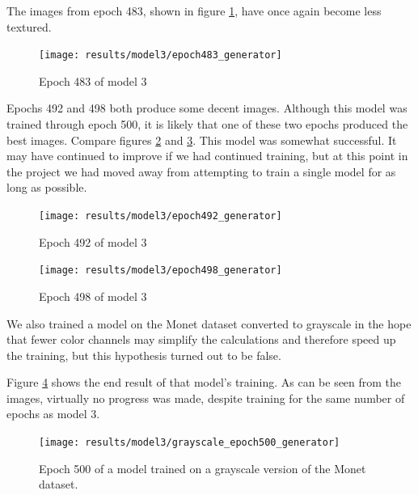\documentclass[11pt,letterpaper]{article}
\begin{document}
				The images from epoch 483, shown in figure \ref{fig:cgm:epoch483generator}, have once again become less textured.
				\begin{figure}
					\centering
					\texttt{[image: results/model3/epoch483\_generator]}
					\caption[]{Epoch 483 of model 3}
					\label{fig:cgm:epoch483generator}
				\end{figure}

				Epochs 492 and 498 both produce some decent images.
				Although this model was trained through epoch 500, it is likely that one of these two epochs produced the best images.
				Compare figures \ref{fig:cgm:epoch492generator} and \ref{fig:cgm:epoch498generator}.
				This model was somewhat successful.
				It may have continued to improve if we had continued training, but at this point in the project we had moved away from attempting to train a single model for as long as possible.
				\begin{figure}
					\centering
					\texttt{[image: results/model3/epoch492\_generator]}
					\caption[]{Epoch 492 of model 3}
					\label{fig:cgm:epoch492generator}
				\end{figure}

				\begin{figure}
					\centering
					\texttt{[image: results/model3/epoch498\_generator]}
					\caption[]{Epoch 498 of model 3}
					\label{fig:cgm:epoch498generator}
				\end{figure}

				We also trained a model on the Monet dataset converted to grayscale in the hope that fewer color channels may simplify the calculations and therefore speed up the training, but this hypothesis turned out to be false.

				Figure \ref{fig:cgm:gray:epoch500generator} shows the end result of that model's training.
				As can be seen from the images, virtually no progress was made, despite training for the same number of epochs as model 3.
				\begin{figure}
					\centering
					\texttt{[image: results/model3/grayscale\_epoch500\_generator]}
					\caption{Epoch 500 of a model trained on a grayscale version of the Monet dataset.}
					\label{fig:cgm:gray:epoch500generator}
				\end{figure}
\end{document}
